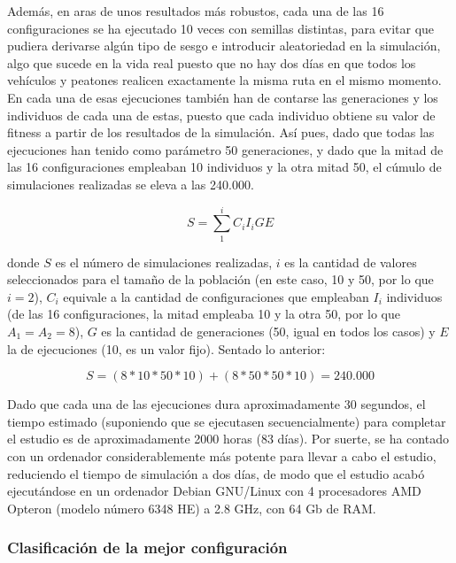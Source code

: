 
Además, en aras de unos resultados más robustos, cada una de las 16 configuraciones se ha ejecutado 10 veces con semillas distintas, para evitar que pudiera derivarse algún tipo de sesgo e introducir aleatoriedad en la simulación, algo que sucede en la vida real puesto que no hay dos días en que todos los vehículos y peatones realicen exactamente la misma ruta en el mismo momento. En cada una de esas ejecuciones también han de contarse las generaciones y los individuos de cada una de estas, puesto que cada individuo obtiene su valor de fitness a partir de los resultados de la simulación. Así pues, dado que todas las ejecuciones han tenido como parámetro 50 generaciones, y dado que la mitad de las 16 configuraciones empleaban 10 individuos y la otra mitad 50, el cúmulo de simulaciones realizadas se eleva a las 240.000.

$$
S = \sum_{1}^{i} C_i  I_i G E
$$

donde $S$ es el número de simulaciones realizadas, $i$ es la cantidad de valores seleccionados para el tamaño de la población (en este caso, 10 y 50, por lo que $i=2$), $C_i$ equivale a la cantidad de configuraciones que empleaban $I_i$ individuos (de las 16 configuraciones, la mitad empleaba 10 y la otra 50, por lo que $A_1 = A_2 = 8$), $G$ es la cantidad de generaciones (50, igual en todos los casos) y $E$ la de ejecuciones (10, es un valor fijo). Sentado lo anterior:

$$
S = (8*10*50*10) + (8*50*50*10) = 240.000
$$

Dado que cada una de las ejecuciones dura aproximadamente 30 segundos, el tiempo estimado (suponiendo que se ejecutasen secuencialmente) para completar el estudio es de aproximadamente 2000 horas (83 días). Por suerte, se ha contado con un ordenador considerablemente más potente para llevar a cabo el estudio, reduciendo el tiempo de simulación a dos días, de modo que el estudio acabó ejecutándose en un ordenador Debian GNU/Linux con 4 procesadores AMD\textregistered{} Opteron\texttrademark{} (modelo número 6348 HE) a 2.8 GHz, con 64 Gb de RAM.

\subsubsection{Clasificación de la mejor configuración}

